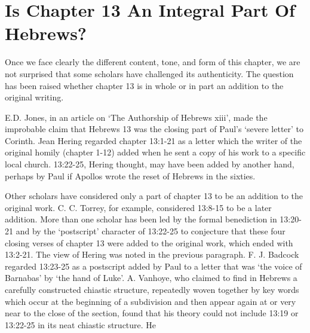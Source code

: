 \section{Is Chapter 13 An Integral Part Of Hebrews?}
Once we face clearly the different content, tone, and form of this chapter, we
are not surprised that some scholars have challenged its authenticity.
The question has been raised whether chapter 13 is in whole or in part an
addition to the original writing.

E.D. Jones, in an article on `The Authorship of Hebrews xiii', made the
improbable claim that Hebrews 13 was the closing part of Paul's `severe letter'
to Corinth.
Jean Hering regarded chapter 13:1-21 as a letter which the writer of the
original homily (chapter 1-12) added when he sent a copy of his work to a
specific local church.
13:22-25, Hering thought, may have been added by another hand, perhaps by Paul
if Apollos wrote the reset of Hebrews in the sixties.

Other scholars have considered only a part of chapter 13 to be an addition to
the original work.
C. C. Torrey, for example, considered 13:8-15 to be a later addition.
More than one scholar has been led by the formal benediction in 13:20-21 and
by the `postscript' character of 13:22-25 to conjecture that these four closing
verses of chapter 13 were added to the original work, which ended with 13:2-21.
The view of Hering was noted in the previous paragraph.
F. J. Badcock regarded 13:23-25 as a postscript added by Paul to a letter that
was `the voice of Barnabas' by `the hand of Luke'.
A. Vanhoye, who claimed to find in Hebrews a carefully constructed chiastic
structure, repeatedly woven together by key words which occur at the beginning
of a subdivision and then appear again at or very near to the close of the
section, found that his theory could not include 13:19 or 13:22-25 in its neat
chiastic structure.
He
